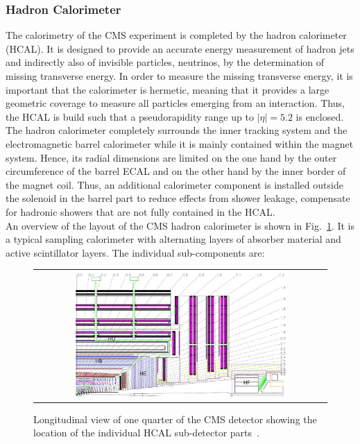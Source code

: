 \subsubsection*{Hadron Calorimeter}
\label{subsec:cms_hcal}
The calorimetry of the CMS experiment is completed by the hadron calorimeter (HCAL). It is designed to provide an accurate energy measurement of hadron jets and indirectly also of invisible particles, \eg neutrinos, by the determination of missing transverse energy. In order to measure the missing transverse energy, it is important that the calorimeter is hermetic, meaning that it provides a large geometric coverage to measure all particles emerging from an interaction. Thus, the HCAL is build such that a pseudorapidity range up to $|\eta| = 5.2$ is enclosed. \\ 
The hadron calorimeter completely surrounds the inner tracking system and the electromagnetic barrel calorimeter while it is mainly contained within the magnet system. Hence, its radial dimensions are limited on the one hand by the outer circumference of the barrel ECAL and on the other hand by the inner border of the magnet coil. Thus, an additional calorimeter component is installed outside the solenoid in the barrel part to reduce effects from shower leakage, \ie compensate for hadronic showers that are not fully contained in the HCAL. \\
An overview of the layout of the CMS hadron calorimeter is shown in Fig.~\ref{fig:CMS_hcal}. It is a typical sampling calorimeter with alternating layers of absorber material and active scintillator layers. The individual sub-components are:
\begin{figure}[!tp]
  \centering
  \begin{tabular}{c}
    \includegraphics[width=0.75\textwidth]{figures/Figures_Experimental_Apparatus_HCAL.png}
  \end{tabular}
  \caption{Longitudinal view of one quarter of the CMS detector showing the location of the individual HCAL sub-detector parts~\cite{Chatrchyan:2008zzk}.}
  \label{fig:CMS_hcal}
\end{figure}
